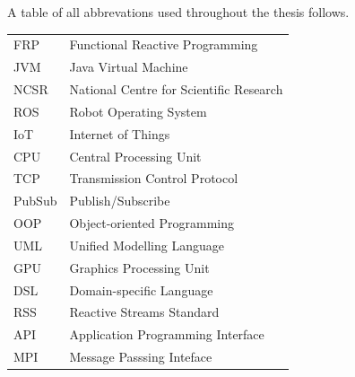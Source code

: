 \documentclass{dithesis}
\begin{document}
\begin{thesisabbreviations}
A table of all abbrevations used throughout the thesis follows.

\begin{tabularx}{\textwidth}{|X|X|}
  \hline
  FRP & Functional Reactive Programming \\
  JVM & Java Virtual Machine \\
  NCSR & National Centre for Scientific Research \\
  ROS & Robot Operating System \\
  IoT & Internet of Things \\
  CPU & Central Processing Unit \\
  TCP & Transmission Control Protocol \\
  PubSub & Publish/Subscribe \\
  OOP & Object-oriented Programming \\
  UML & Unified Modelling Language \\
  GPU & Graphics Processing Unit \\
  DSL & Domain-specific Language \\
  RSS & Reactive Streams Standard \\
  API & Application Programming Interface \\
  MPI & Message Passsing Inteface \\
  \hline
\end{tabularx}

\end{thesisabbreviations}

\newpage

{}
\end{document}
